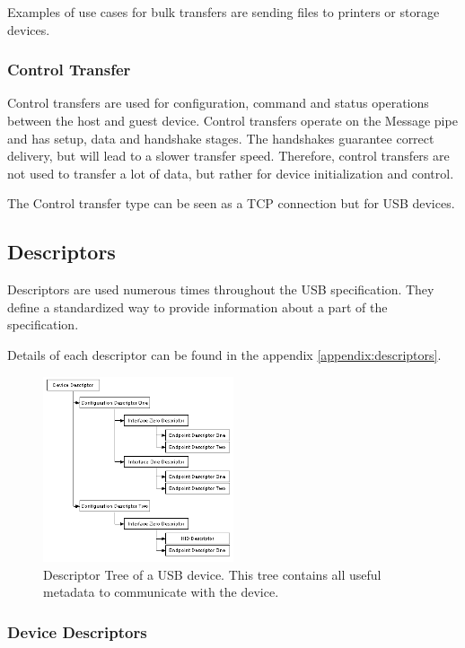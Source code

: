 Examples of use cases for bulk transfers are sending files to printers or storage devices.

\subsubsection{Control Transfer}
Control transfers are used for configuration, command and status operations between the host and guest device. Control transfers operate on the Message pipe and has setup, data and handshake stages. The handshakes guarantee correct delivery, but will lead to a slower transfer speed. Therefore, control transfers are not used to transfer a lot of data, but rather for device initialization and control.

The Control transfer type can be seen as a TCP connection but for USB devices.

\subsection{Descriptors}

Descriptors are used numerous times throughout the USB specification. They define a standardized way to provide information about a part of the specification.

Details of each descriptor can be found in the appendix \ref{appendix:descriptors}.

\begin{figure}[h]
  \centering
  \includegraphics[width=0.5\textwidth]{images/descriptor_tree.png}
  \caption{Descriptor Tree of a USB device. This tree contains all useful metadata to communicate with the device.}
  \label{fig:descriptor_tree}
\end{figure}

\subsubsection{Device Descriptors}


